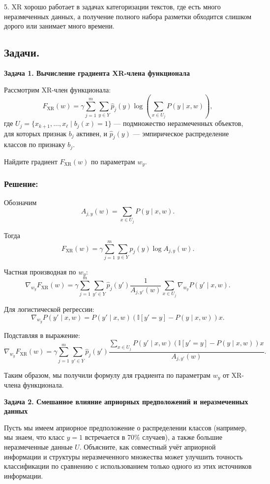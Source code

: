 5. XR хорошо работает в задачах категоризации текстов, где есть много неразмеченных данных, а получение полного набора разметки обходится слишком дорого или занимает много времени.

\subsection*{Задачи.}

\bigskip

\noindent\textbf{Задача 1. Вычисление градиента XR-члена функционала}

Рассмотрим XR-член функционала:
\[
F_{\text{XR}}(w) = \gamma \sum_{j=1}^m \sum_{y \in Y} \hat{p}_j(y) \log\left(\sum_{x \in U_j} P(y \mid x,w)\right),
\]
где $U_j = \{ x_{k+1}, \ldots, x_{\ell} \mid b_j(x)=1 \}$ — подмножество неразмеченных объектов, для которых признак $b_j$ активен, и $\hat{p}_j(y)$ — эмпирическое распределение классов по признаку $b_j$.

Найдите градиент $F_{\text{XR}}(w)$ по параметрам $w_y$.

\subsubsection*{Решение:}

Обозначим
\[
A_{j,y}(w) = \sum_{x \in U_j} P(y \mid x,w).
\]

Тогда
\[
F_{\text{XR}}(w) = \gamma \sum_{j=1}^m \sum_{y \in Y} \hat{p}_j(y) \log A_{j,y}(w).
\]

Частная производная по $w_y$:
\[
\nabla_{w_y} F_{\text{XR}}(w) = \gamma \sum_{j=1}^m \sum_{y' \in Y} \hat{p}_j(y') \frac{1}{A_{j,y'}(w)} \sum_{x \in U_j} \nabla_{w_y}P(y' \mid x,w).
\]

Для логистической регрессии:
\[
\nabla_{w_y}P(y' \mid x,w) = P(y' \mid x,w)(\mathbb{I}[y'=y]-P(y \mid x,w))x.
\]

Подставляя в выражение:
\[
\nabla_{w_y} F_{\text{XR}}(w) = \gamma \sum_{j=1}^m \sum_{y' \in Y} \hat{p}_j(y') \frac{\sum_{x \in U_j} P(y' \mid x,w)(\mathbb{I}[y'=y]-P(y \mid x,w))x}{A_{j,y'}(w)}.
\]

Таким образом, мы получили формулу для градиента по параметрам $w_y$ от XR-члена функционала.

\bigskip

\noindent\textbf{Задача 2. Смешанное влияние априорных предположений и неразмеченных данных}

Пусть мы имеем априорное предположение о распределении классов (например, мы знаем, что класс $y=1$ встречается в 70\% случаев), а также большие неразмеченные данные $U$. Объясните, как совместный учёт априорной информации и структуры неразмеченного множества может улучшить точность классификации по сравнению с использованием только одного из этих источников информации.

